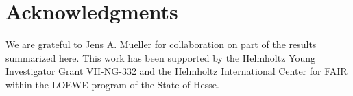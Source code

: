 \documentclass[a4paper,fleqn]{cls/cas-dc}
\begin{document}
\section*{Acknowledgments}
We are grateful to Jens A. Mueller for collaboration on part of the results summarized here. This work has been supported
by the Helmholtz Young Investigator Grant VH-NG-332 and the Helmholtz International Center for FAIR within the LOEWE
program of the State of Hesse.





\end{document}
